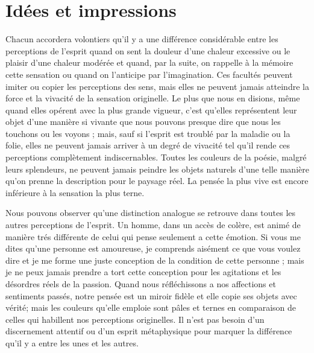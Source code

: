 
\section{Idées et impressions}
Chacun accordera volontiers qu’il y a une différence
considérable entre les perceptions de l'esprit quand on
sent la douleur d’une chaleur excessive ou le plaisir d’une
chaleur modérée et quand, par la suite, on rappelle à la
mémoire cette sensation ou quand on l’anticipe par l’imagination.
Ces facultés peuvent imiter ou copier les perceptions
des sens, mais elles ne peuvent jamais atteindre
la force et la vivacité de la sensation originelle. Le plus
que nous en disions, même quand elles opérent avec la
plus grande vigueur, c’est qu’elles représentent leur objet
d’une manière si vivante que nous pouvons presque dire
que nous les touchons ou les voyons ; mais, sauf si l’esprit
est troublé par la maladie ou la folie, elles ne peuvent
jamais arriver à un degré de vivacité tel qu’il rende ces
perceptions complètement indiscernables. Toutes les
couleurs de la poésie, malgré leurs splendeurs, ne peuvent
jamais peindre les objets naturels d’une telle manière
qu’on prenne la description pour le paysage réel. La
pensée la plus vive est encore inférieure à la sensation la
plus terne.

Nous pouvons observer qu’une distinction analogue se
retrouve dans toutes les autres perceptions de l'esprit.
Un homme, dans un accès de colère, est animé de manière
trés différente de celui qui pense seulement a cette émotion.
Si vous me dites qu’une personne est amoureuse, je comprends
aisément ce que vous voulez dire et je me forme
une juste conception de la condition de cette personne ;
mais je ne peux jamais prendre a tort cette conception
pour les agitations et les désordres réels de la passion.
Quand nous réfléchissons a nos affections et sentiments
passés, notre pensée est un miroir fidèle et elle copie ses
objets avec vérité; mais les couleurs qu'elle emploie
sont pâles et ternes en comparaison de celles qui habillent
nos perceptions originelles. Il n’est pas besoin d’un discernement
attentif ou d’un esprit métaphysique pour
marquer la différence qu’il y a entre les unes et les autres.

